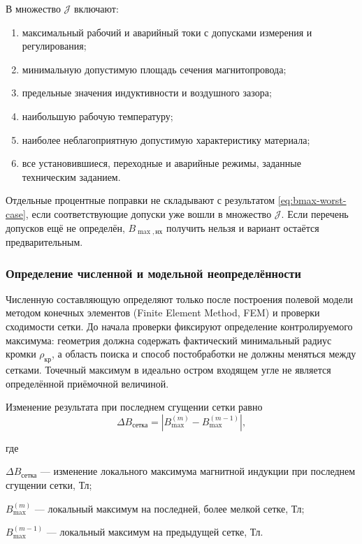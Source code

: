\documentclass[14pt,a4paper]{extarticle}
\newenvironment{whereblock}
 {\par\noindent где\par
  \begin{list}{}{\setlength{\leftmargin}{12.5mm}
                  \setlength{\itemindent}{-12.5mm}
                  \setlength{\itemsep}{0pt}
                  \setlength{\parsep}{0pt}
                  \setlength{\topsep}{0pt}}}
 {\end{list}}
\newcommand{\whereitem}[2]{\item[] #1 --- #2}
\begin{document}
В множество $\mathcal J$ включают:
\begin{enumerate}
\item максимальный рабочий и аварийный токи с допусками измерения и
регулирования;
\item минимальную допустимую площадь сечения магнитопровода;
\item предельные значения индуктивности и воздушного зазора;
\item наибольшую рабочую температуру;
\item наиболее неблагоприятную допустимую характеристику материала;
\item все установившиеся, переходные и аварийные режимы, заданные
техническим заданием.
\end{enumerate}

Отдельные процентные поправки не складывают с результатом
\eqref{eq:bmax-worst-case}, если соответствующие допуски уже вошли в
множество $\mathcal J$. Если перечень допусков ещё не определён,
$B_{\max,\text{нх}}$ получить нельзя и вариант остаётся предварительным.

\subsubsection{Определение численной и модельной неопределённости}

Численную составляющую определяют только после построения полевой модели
методом конечных элементов (Finite Element Method, FEM) и проверки
сходимости сетки. До начала проверки фиксируют определение контролируемого
максимума: геометрия должна содержать фактический минимальный радиус кромки
$\rho_{\text{кр}}$, а область поиска и способ постобработки не должны
меняться между сетками. Точечный максимум в идеально остром входящем угле
не является определённой приёмочной величиной.

Изменение результата при последнем сгущении сетки равно
\begin{equation}
 \Delta B_{\text{сетка}}=
 \left|
 B_{\max}^{(m)}-
 B_{\max}^{(m-1)}
 \right|,
 \label{eq:b-mesh-uncertainty}
\end{equation}
\begin{whereblock}
\whereitem{$\Delta B_{\text{сетка}}$}{изменение локального максимума
магнитной индукции при последнем сгущении сетки, Тл;}
\whereitem{$B_{\max}^{(m)}$}{локальный максимум на последней, более
мелкой сетке, Тл;}
\whereitem{$B_{\max}^{(m-1)}$}{локальный максимум на предыдущей
сетке, Тл.}
\end{whereblock}
\end{document}

